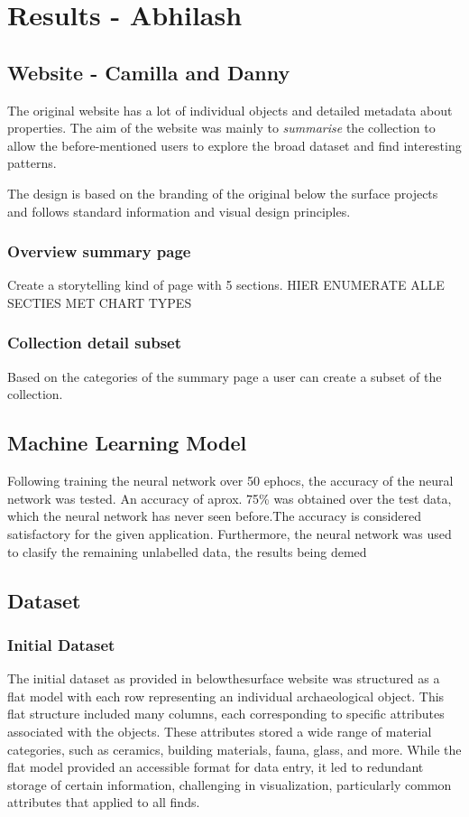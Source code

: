 \section{Results - Abhilash}

\subsection{Website - Camilla and Danny}

The original website has a lot of individual objects and detailed metadata about properties. The aim of the website was mainly to \textit{summarise} the collection to allow the before-mentioned users to explore the broad dataset and find interesting patterns.

The design is based on the branding of the original below the surface projects and follows standard information and visual design principles.

\subsubsection{Overview summary page}
Create a storytelling kind of page with 5 sections. HIER ENUMERATE ALLE SECTIES MET CHART TYPES

\subsubsection{Collection detail subset}
Based on the categories of the summary page a user can create a subset of the collection.

\subsection{Machine Learning Model}
Following training the neural network over 50 ephocs, the accuracy of the neural network was tested. An accuracy of aprox. 75\% was obtained over the test data, which the neural network has never seen before.The accuracy is considered satisfactory for the given application. Furthermore, the neural network was used to clasify the remaining unlabelled data, the results being demed

\subsection{Dataset}

\subsubsection{Initial Dataset}
The initial dataset as provided in belowthesurface website was structured as a flat model with each row representing an individual archaeological object. This flat structure included many columns, each corresponding to specific attributes associated with the objects. These attributes stored a wide range of material categories, such as ceramics, building materials, fauna, glass, and more. While the flat model provided an accessible format for data entry, it led to redundant storage of certain information, challenging in visualization, particularly common attributes that applied to all finds.

